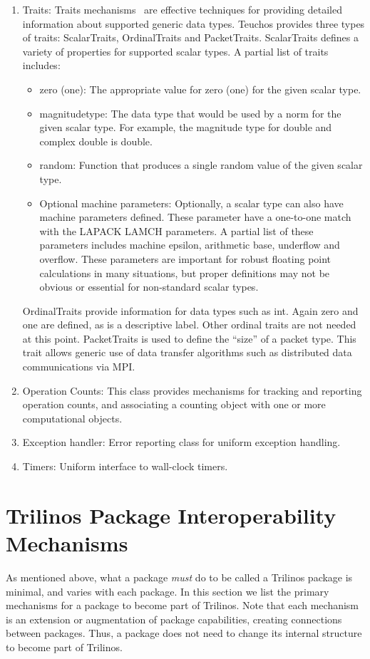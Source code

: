 \documentclass[acmtoms,acmnow]{acmtrans2m}
\begin{document}
\begin{enumerate}
\item Traits: Traits mechanisms~\cite{MyersTraits} are effective techniques
for providing detailed information about supported generic data types.
Teuchos provides three types of traits: ScalarTraits, OrdinalTraits
and PacketTraits.
ScalarTraits defines a variety of properties for supported scalar
types.  A partial list of traits includes:
\begin{itemize}
\item zero (one): The appropriate value for zero (one) for the given
scalar type.
\item magnitudetype: The data type that would be used by a norm for
the given scalar type.  For example, the magnitude type for double and
complex double is double.
\item random: Function that produces a single random value of the
given scalar type.
\item Optional machine parameters: Optionally, a scalar type can also
have machine parameters defined.  These parameter have a one-to-one
match with the LAPACK LAMCH parameters.  A partial list of these
parameters includes machine epsilon, arithmetic base, underflow and
overflow.  These parameters are important for robust floating point
calculations in many situations, but proper definitions may not be
obvious or essential for non-standard scalar types.
\end{itemize}

OrdinalTraits provide information for data types such as int.  Again
zero and one are defined, as is a descriptive label.  Other ordinal traits are
not needed at this point.  PacketTraits is used to define the ``size'' of a packet type.  This
trait allows generic use of data transfer algorithms such as
distributed data communications via MPI.

\item Operation Counts: This class provides mechanisms for tracking
and reporting operation counts, and associating a counting object with
one or more computational objects.

\item Exception handler:  Error reporting class for uniform exception
handling.

\item Timers:  Uniform interface to wall-clock timers.

\end{enumerate}

\section{Trilinos Package Interoperability Mechanisms}
\label{sect:PackageDefinition}
As mentioned above, what a package {\it must} do to be called a Trilinos
package is minimal, and varies with each package.  In this section we
list the primary mechanisms for a package to become part of Trilinos.
Note that each mechanism is an extension or augmentation of package
capabilities, creating connections between packages.  Thus, a package does 
not need to change its internal structure to become part of Trilinos.
\end{document}
